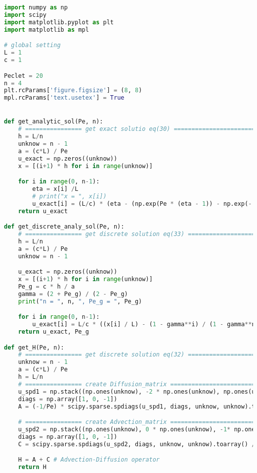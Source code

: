 \documentclass[11pt,letterpaper]{article}
\begin{document}
\section*{}
\begin{lstlisting}[language=Python, caption=Qusetion 1 Python code]
import numpy as np
import scipy
import matplotlib.pyplot as plt
import matplotlib as mpl

# global setting
L = 1
c = 1

Peclet = 20
n = 4
plt.rcParams['figure.figsize'] = (8, 8)
mpl.rcParams['text.usetex'] = True


def get_analytic_sol(Pe, n):
    # ================ get exact solutio eq(30) =======================
    h = L/n
    unknow = n - 1
    a = (c*L) / Pe
    u_exact = np.zeros((unknow))
    x = [(i+1) * h for i in range(unknow)]

    for i in range(0, n-1):
        eta = x[i] /L
        # print("x = ", x[i])
        u_exact[i] = (L/c) * (eta - (np.exp(Pe * (eta - 1)) - np.exp(- Pe)) / (1 - np.exp(- Pe)))
    return u_exact

def get_discrete_analy_sol(Pe, n):
    # ================ get discrete solution eq(33) ===================
    h = L/n
    a = (c*L) / Pe
    unknow = n - 1

    u_exact = np.zeros((unknow))
    x = [(i+1) * h for i in range(unknow)]
    Pe_g = c * h / a
    gamma = (2 + Pe_g) / (2 - Pe_g)
    print("n = ", n, ", Pe_g = ", Pe_g)

    for i in range(0, n-1):
        u_exact[i] = L/c * ((x[i] / L) - (1 - gamma**i) / (1 - gamma**n))
    return u_exact, Pe_g

def get_H(Pe, n):
    # ================ get discrete solution eq(32) ===================
    unknow = n - 1
    a = (c*L) / Pe
    h = L/n
    # ================ create Diffusion_matrix ========================
    u_spd1 = np.stack((np.ones(unknow), -2 * np.ones(unknow), np.ones(unknow)))
    diags = np.array([1, 0, -1])
    A = (-1/Pe) * scipy.sparse.spdiags(u_spd1, diags, unknow, unknow).toarray() / h**2

    # ================ create Advection_matrix ========================
    u_spd2 = np.stack((np.ones(unknow), 0 * np.ones(unknow), -1* np.ones(unknow)))
    diags = np.array([1, 0, -1])
    C = scipy.sparse.spdiags(u_spd2, diags, unknow, unknow).toarray() / (2*h)

    H = A + C # Advection-Diffusion operator
    return H



\end{lstlisting}
\end{document}
